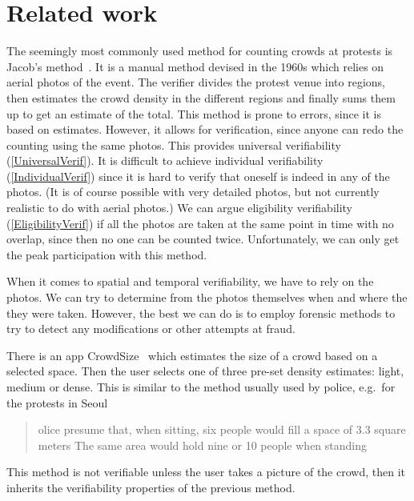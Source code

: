 \section{Related work}%
\label{RelatedWork}

The seemingly most commonly used method for counting crowds at protests is 
Jacob's method~\cite[c.f.][]{%
  2016DemonstrationsInSeoul,%
  BBCHowToCountProtestNumbers,%
  HowWillWeKnowTrumpInauguralCrowdSize,%
  TheXManMarch,%
  TheCrowdNumbersGame,%
}.
It is a manual method devised in the 1960s which relies on aerial photos of the 
event.
The verifier divides the protest venue into regions, then estimates the crowd 
density in the different regions and finally sums them up to get an estimate of 
the total.
This method is prone to errors, since it is based on estimates.
However, it allows for verification, since anyone can redo the counting using 
the same photos.
This provides universal verifiability (\cref{UniversalVerif}).
It is difficult to achieve individual verifiability (\cref{IndividualVerif}) 
since it is hard to verify that oneself is indeed in any of the photos.
(It is of course possible with very detailed photos, but not currently realistic 
to do with aerial photos.)
We can argue eligibility verifiability (\cref{EligibilityVerif}) if all the 
photos are taken at the same point in time with no overlap, since then no one 
can be counted twice.
Unfortunately, we can only get the peak participation with this method.

When it comes to spatial and temporal verifiability, we have to rely on the 
photos.
We can try to determine from the photos themselves when and where the they were 
taken.
However, the best we can do is to employ forensic methods to try to detect any 
modifications or other attempts at fraud.

There is an app CrowdSize~\cite{CrowdSize} which estimates the size of a crowd 
based on a selected space.
Then the user selects one of three pre-set density estimates: light, medium or 
dense.
This is similar to the method usually used by police, e.g.\ for the protests in
Seoul
\blockcquote{2016DemonstrationsInSeoul}{%
  olice presume that, when sitting, six people would 
  fill a space of 
  3.3 square meters
  \textelp{}
  The same area would hold nine or 10 people when standing%
}.
This method is not verifiable unless the user takes a picture of the crowd, 
then it inherits the verifiability properties of the previous method.

